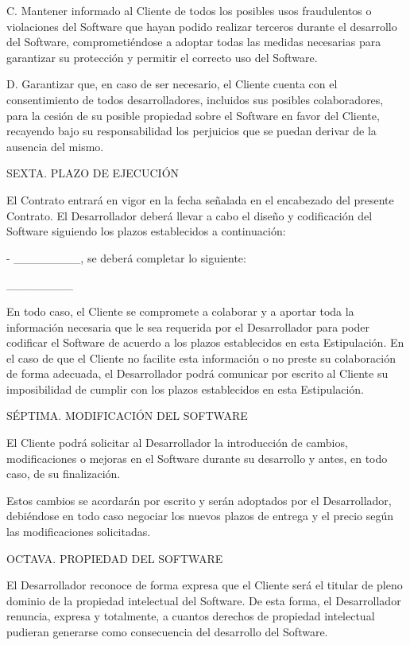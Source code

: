 \documentclass[a4paper,11pt]{report}
\begin{document}
C. Mantener informado al Cliente de todos los posibles usos fraudulentos
o violaciones del Software que hayan podido realizar terceros durante el
desarrollo del Software, comprometiéndose a adoptar todas las medidas
necesarias para garantizar su protección y permitir el correcto uso del
Software.

D. Garantizar que, en caso de ser necesario, el Cliente cuenta con el
consentimiento de todos desarrolladores, incluidos sus posibles
colaboradores, para la cesión de su posible propiedad sobre el Software
en favor del Cliente, recayendo bajo su responsabilidad los perjuicios
que se puedan derivar de la ausencia del mismo.

SEXTA. PLAZO DE EJECUCIÓN

El Contrato entrará en vigor en la fecha señalada en el encabezado del
presente Contrato. El Desarrollador deberá llevar a cabo el diseño y
codificación del Software siguiendo los plazos establecidos a
continuación:

- \_\_\_\_\_\_\_\_, se deberá completar lo siguiente:

\_\_\_\_\_\_\_\_

En todo caso, el Cliente se compromete a colaborar y a aportar toda la
información necesaria que le sea requerida por el Desarrollador para
poder codificar el Software de acuerdo a los plazos establecidos en esta
Estipulación. En el caso de que el Cliente no facilite esta información
o no preste su colaboración de forma adecuada, el Desarrollador podrá
comunicar por escrito al Cliente su imposibilidad de cumplir con los
plazos establecidos en esta Estipulación.

SÉPTIMA. MODIFICACIÓN DEL SOFTWARE

El Cliente podrá solicitar al Desarrollador la introducción de cambios,
modificaciones o mejoras en el Software durante su desarrollo y antes,
en todo caso, de su finalización.

Estos cambios se acordarán por escrito y serán adoptados por el
Desarrollador, debiéndose en todo caso negociar los nuevos plazos de
entrega y el precio según las modificaciones solicitadas.

OCTAVA. PROPIEDAD DEL SOFTWARE

El Desarrollador reconoce de forma expresa que el Cliente será el
titular de pleno dominio de la propiedad intelectual del Software. De
esta forma, el Desarrollador renuncia, expresa y totalmente, a cuantos
derechos de propiedad intelectual pudieran generarse como consecuencia
del desarrollo del Software.
\end{document}
